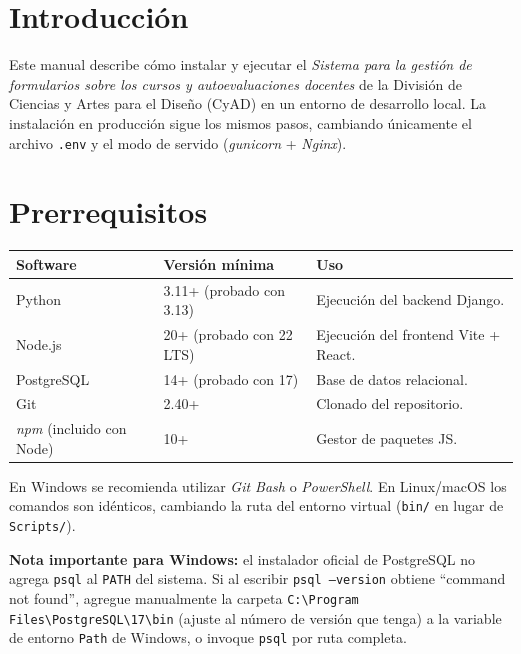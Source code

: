 \documentclass{computacion}
\begin{document}
\portada
\setcounter{page}{1}
\pagestyle{fancy}

\section{Introducción}
Este manual describe cómo instalar y ejecutar el \emph{Sistema para la gestión de formularios sobre los cursos y autoevaluaciones docentes} de la División de Ciencias y Artes para el Diseño (CyAD) en un entorno de desarrollo local. La instalación en producción sigue los mismos pasos, cambiando únicamente el archivo \texttt{.env} y el modo de servido (\emph{gunicorn} + \emph{Nginx}).

\section{Prerrequisitos}

\begin{longtable}{p{} p{} p{}}
    \toprule
    \textbf{Software} & \textbf{Versión mínima} & \textbf{Uso} \\
    \midrule
    \endhead
    Python & 3.11+ (probado con 3.13) & Ejecución del backend Django. \\
    \midrule
    Node.js & 20+ (probado con 22 LTS) & Ejecución del frontend Vite + React. \\
    \midrule
    PostgreSQL & 14+ (probado con 17) & Base de datos relacional. \\
    \midrule
    Git & 2.40+ & Clonado del repositorio. \\
    \midrule
    \emph{npm} (incluido con Node) & 10+ & Gestor de paquetes JS. \\
    \bottomrule
\end{longtable}

En Windows se recomienda utilizar \emph{Git Bash} o \emph{PowerShell}. En Linux/macOS los comandos son idénticos, cambiando la ruta del entorno virtual (\texttt{bin/} en lugar de \texttt{Scripts/}).

\textbf{Nota importante para Windows:} el instalador oficial de PostgreSQL no agrega \texttt{psql} al \texttt{PATH} del sistema. Si al escribir \texttt{psql --version} obtiene ``command not found'', agregue manualmente la carpeta \texttt{C:\textbackslash Program Files\textbackslash PostgreSQL\textbackslash 17\textbackslash bin} (ajuste al número de versión que tenga) a la variable de entorno \texttt{Path} de Windows, o invoque \texttt{psql} por ruta completa.
\end{document}
